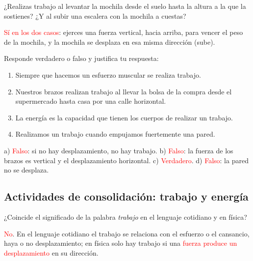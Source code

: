 \begin{exercise}
    ¿Realizas trabajo al levantar la mochila desde el suelo hasta la altura a la que la sostienes? ¿Y al subir una escalera con la mochila a cuestas?
    \begin{solu}
        \textcolor{red}{Sí en los dos casos}: ejerces una fuerza vertical, hacia arriba, para vencer el peso de la mochila, y la mochila se desplaza en esa misma dirección (sube).
    \end{solu}
\end{exercise}

\begin{exercise}
    Responde verdadero o falso y justifica tu respuesta:
    \begin{enumerate}[label=\alph*)]
        \item Siempre que hacemos un esfuerzo muscular se realiza trabajo.
        \item Nuestros brazos realizan trabajo al llevar la bolsa de la compra desde el supermercado hasta casa por una calle horizontal.
        \item La energía es la capacidad que tienen los cuerpos de realizar un trabajo.
        \item Realizamos un trabajo cuando empujamos fuertemente una pared.
    \end{enumerate}
    \begin{solu}
        a) \textcolor{red}{Falso}: si no hay desplazamiento, no hay trabajo. b) \textcolor{red}{Falso}: la fuerza de los brazos es vertical y el desplazamiento horizontal. c) \textcolor{red}{Verdadero}. d) \textcolor{red}{Falso}: la pared no se desplaza.
    \end{solu}
\end{exercise}

\subsection*{Actividades de consolidación: trabajo y energía}

\begin{exercise}
    ¿Coincide el significado de la palabra \emph{trabajo} en el lenguaje cotidiano y en física?
    \begin{solu}
        \textcolor{red}{No}. En el lenguaje cotidiano el trabajo se relaciona con el esfuerzo o el cansancio, haya o no desplazamiento; en física solo hay trabajo si una \textcolor{red}{fuerza produce un desplazamiento} en su dirección.
    \end{solu}
\end{exercise}

